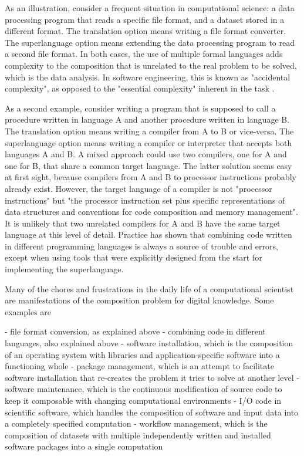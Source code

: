 As an illustration, consider a frequent situation in computational science: a data processing program that reads a specific file format, and a dataset stored in a different format. The translation option means writing a file format converter. The superlanguage option means extending the data processing program to read a second file format. In both cases, the use of multiple formal languages adds complexity to the composition that is unrelated to the real problem to be solved, which is the data analysis. In software engineering, this is known as "accidental complexity", as opposed to the "essential complexity" inherent in the task \cite{brooks_no_1987}.

As a second example, consider writing a program that is supposed to call a procedure written in language A and another procedure written in language B. The translation option means writing a compiler from A to B or vice-versa. The superlanguage option means writing a compiler or interpreter that accepts both languages A and B. A mixed approach could use two compilers, one for A and one for B, that share a common target language. The latter solution seems easy at first sight, because compilers from A and B to processor instructions probably already exist. However, the target language of a compiler is not "processor instructions" but "the processor instruction set plus specific representations of data structures and conventions for code composition and memory management". It is unlikely that two unrelated compilers for A and B have the same target language at this level of detail. Practice has shown that combining code written in different programming languages is always a source of trouble and errors, except when using tools that were explicitly designed from the start for implementing the superlanguage.

Many of the chores and frustrations in the daily life of a computational scientist are manifestations of the composition problem for digital knowledge. Some examples are

 - file format conversion, as explained above
 - combining code in different languages, also explained above
 - software installation, which is the composition of an operating system with libraries and application-specific software into a functioning whole
 - package management, which is an attempt to facilitate software installation that re-creates the problem it tries to solve at another level
 - software maintenance, which is the continuous modification of source code to keep it composable with changing computational environments
 - I/O code in scientific software, which handles the composition of software and input data into a completely specified computation
 - workflow management, which is the composition of datasets with multiple independently written and installed software packages into a single computation

